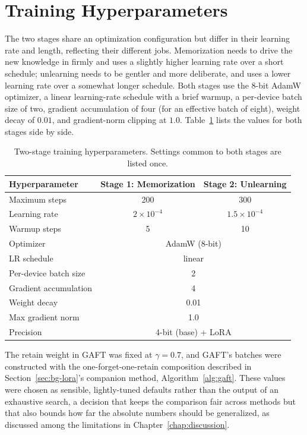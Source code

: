 \documentclass[a4paper,12pt]{report}
\begin{document}
\section{Training Hyperparameters}
The two stages share an optimization configuration but differ in their learning rate and length, reflecting their different jobs. Memorization needs to drive the new knowledge in firmly and uses a slightly higher learning rate over a short schedule; unlearning needs to be gentler and more deliberate, and uses a lower learning rate over a somewhat longer schedule. Both stages use the 8-bit AdamW optimizer, a linear learning-rate schedule with a brief warmup, a per-device batch size of two, gradient accumulation of four (for an effective batch of eight), weight decay of $0.01$, and gradient-norm clipping at $1.0$. Table~\ref{tab:hparams} lists the values for both stages side by side.

\begin{table}[htbp]
	\centering
	\caption{Two-stage training hyperparameters. Settings common to both stages are listed once.}
	\label{tab:hparams}
	\begin{tabular}{l c c}
		\toprule
		\textbf{Hyperparameter} & \textbf{Stage 1: Memorization} & \textbf{Stage 2: Unlearning} \\
		\midrule
		Maximum steps & 200 & 300 \\
		Learning rate & $2\times10^{-4}$ & $1.5\times10^{-4}$ \\
		Warmup steps & 5 & 10 \\
		\midrule
		Optimizer & \multicolumn{2}{c}{AdamW (8-bit)} \\
		LR schedule & \multicolumn{2}{c}{linear} \\
		Per-device batch size & \multicolumn{2}{c}{2} \\
		Gradient accumulation & \multicolumn{2}{c}{4} \\
		Weight decay & \multicolumn{2}{c}{0.01} \\
		Max gradient norm & \multicolumn{2}{c}{1.0} \\
		Precision & \multicolumn{2}{c}{4-bit (base) + LoRA} \\
		\bottomrule
	\end{tabular}
\end{table}

The retain weight in GAFT was fixed at $\gamma = 0.7$, and GAFT's batches were constructed with the one-forget-one-retain composition described in Section~\ref{sec:bg-lora}'s companion method, Algorithm~\ref{alg:gaft}. These values were chosen as sensible, lightly-tuned defaults rather than the output of an exhaustive search, a decision that keeps the comparison fair across methods but that also bounds how far the absolute numbers should be generalized, as discussed among the limitations in Chapter~\ref{chap:discussion}.
\end{document}
